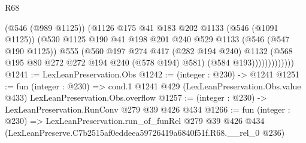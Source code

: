 \begin{lexlean}{R68}
\begin{coremodule}
                      (@546 (@989 @1125))
                      (@1126
                        @175
                        @41
                        @183
                        @202
                        @1133
                        (@546 (@1091 @1125))
                        (@530
                          @1125
                          @190
                          @41
                          @198
                          @201
                          @240
                          @529
                          @1133
                          (@546 (@547 @190 @1125))
                          @555
                          (@560
                            @197
                            @274
                            @417
                            (@282 @194 @240)
                            @1132
                            (@568 @195 @80 @272 @272 @194 @240 (@578 @194) @581)
                            (@584 @193)))))))))))))
@1241 := LexLeanPreservation.Obs
@1242 := (integer : @230) -> @1241
@1251 := fun (integer : @230) =>
  cond.{1} @1241 @429 (LexLeanPreservation.Obs.value @433) LexLeanPreservation.Obs.overflow
@1257 := (integer : @230) -> LexLeanPreservation.RunConv @279 @39 @426 @434
@1266 := fun (integer : @230) =>
  LexLeanPreservation.run_of_funRel
    @279
    @39
    @426
    @434
    (LexLeanPreserve.C7b2515af0eddeea59726419a6840f51f.R68.__rel_0 @236)
\end{coremodule}
\end{lexlean}
